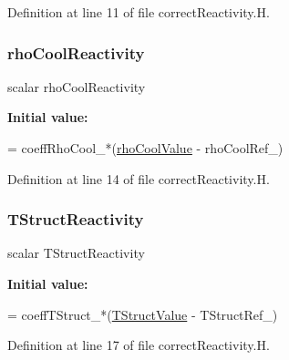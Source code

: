 Definition at line 11 of file correct\+Reactivity.\+H.

\mbox{\label{correctReactivity_8H_ad58b239c992acdaf252773123854e721}} 
\subsubsection{\texorpdfstring{rho\+Cool\+Reactivity}{rhoCoolReactivity}}
{\footnotesize\ttfamily scalar rho\+Cool\+Reactivity}

{\bfseries Initial value\+:}
\begin{DoxyCode}
=
    coeffRhoCool\_*(\hyperlink{computeFeedbackFieldValues_8H_adfa280f8c80d99ac065a923d399c8324}{rhoCoolValue} - rhoCoolRef\_)
\end{DoxyCode}


Definition at line 14 of file correct\+Reactivity.\+H.

\mbox{\label{correctReactivity_8H_ac012a5ef75a40fa44a9cf33c92481b1a}} 
\subsubsection{\texorpdfstring{T\+Struct\+Reactivity}{TStructReactivity}}
{\footnotesize\ttfamily scalar T\+Struct\+Reactivity}

{\bfseries Initial value\+:}
\begin{DoxyCode}
=
    coeffTStruct\_*(\hyperlink{computeFeedbackFieldValues_8H_a8baccdc34d49127c54a0a60ba9818c0c}{TStructValue} - TStructRef\_)
\end{DoxyCode}


Definition at line 17 of file correct\+Reactivity.\+H.

\mbox{\label{correctReactivity_8H_ada688315955c2733c6208ecefdd38475}} 
